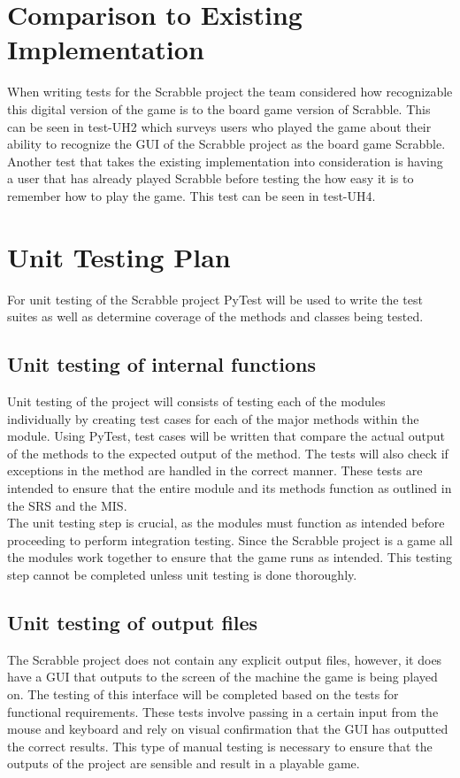 \documentclass[12pt, titlepage]{article}
\begin{document}
\section{Comparison to Existing Implementation}	%
When writing tests for the Scrabble project the team considered how recognizable this digital version of the game is to the board game version of Scrabble. This can be seen in test-UH2 which surveys users who played the game about their ability to recognize the GUI of the Scrabble project as the board game Scrabble.\\
Another test that takes the existing implementation into consideration is having a user that has already played Scrabble before testing the how easy it is to remember how to play the game. This test can be seen in test-UH4.
\section{Unit Testing Plan}%
For unit testing of the Scrabble project PyTest will be used to write the test suites as well as determine coverage of the methods and classes being tested. 
\subsection{Unit testing of internal functions}
Unit testing of the project will consists of testing each of the modules individually by creating test cases for each of the major methods within the module. Using PyTest, test cases will be written that  compare the actual output of the methods to the expected output of the method. The tests will also check if exceptions in the method are handled in the correct manner. These tests are intended to ensure that the entire module and its methods function as outlined in the SRS and the MIS.\\
The unit testing step is crucial, as the modules must function as intended before proceeding to perform integration testing. Since the Scrabble project is a game all the modules work together to ensure that the game runs as intended. This testing step cannot be completed unless unit testing is done thoroughly.
		
\subsection{Unit testing of output files}	
The Scrabble project does not contain any explicit output files, however, it does have a GUI that outputs to the screen of the machine the game is being played on. The testing of this interface will be completed based on the tests for functional requirements. These tests involve passing in a certain input from the mouse and keyboard and rely on visual confirmation that the GUI has outputted the correct results. This type of manual testing is necessary to ensure that the outputs of the project are sensible and result in a playable game.
\end{document}
